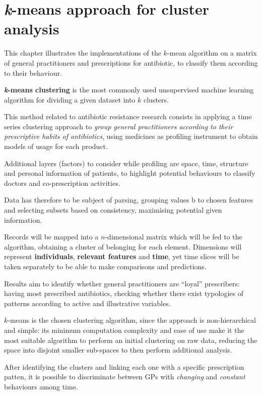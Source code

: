 \chapter[k-means approach]{\textit{k}-means approach for cluster analysis}
This chapter illustrates the implementations of the $k$-mean algorithm on a matrix of general practitioners and prescriptions for antibiotic, to classify them according to their behaviour.

\textbf{\textit{k}-means clustering} is the most commonly used unsupervised machine learning algorithm for dividing a given dataset into $k$ clusters. 

This method related to antibiotic resistance research consists in applying a time series clustering approach to \textit{group general practitioners according to their prescriptive habits of antibiotics}, using medicines as profiling instrument to obtain models of usage for each product.

Additional layers (factors) to consider while profiling are space, time, structure and personal information of patients, to highlight potential behaviours to classify doctors and co-prescription activities. 

Data has therefore to be subject of parsing, grouping values b to chosen features and selecting subsets based on consistency, maximising potential given information. 

Records will be mapped into a $n$-dimensional matrix which will be fed to the algorithm, obtaining a cluster of belonging for each element. Dimensions will represent \textbf{individuals}, \textbf{relevant features} and \textbf{time}, yet time slices will be taken separately to be able to make comparisons and predictions. 

Results aim to identify whether general practitioners are ``loyal'' prescribers: having most prescribed antibiotics, checking whether there exist typologies of patterns according to active and illustrative variables. 

$k$-means is the chosen clustering algorithm, since the approach is non-hierarchical and simple: its minimum computation complexity and ease of use make it the most suitable algorithm to perform an initial clustering on raw data, reducing the space into disjoint smaller sub-spaces to then perform additional analysis.

After identifying the clusters and linking each one with a specific prescription patten, it is possible to discriminate between GPs with \textit{changing} and \textit{constant} behaviours among time.


